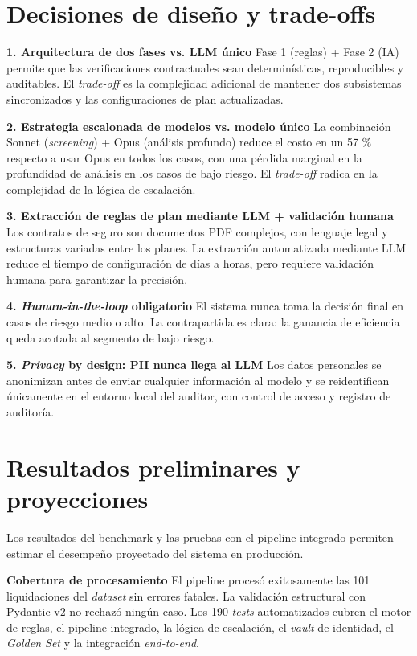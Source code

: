 \section{Decisiones de diseño y trade-offs}

\noindent \textbf{1. Arquitectura de dos fases vs. LLM único} Fase 1 (reglas) + Fase 2 (IA) permite que las verificaciones contractuales sean determinísticas, reproducibles y auditables. El \textit{trade-off} es la complejidad adicional de mantener dos subsistemas sincronizados y las configuraciones de plan actualizadas.

\noindent \textbf{2. Estrategia escalonada de modelos vs. modelo único} La combinación Sonnet (\textit{screening}) + Opus (análisis profundo) reduce el costo en un 57 \% respecto a usar Opus en todos los casos, con una pérdida marginal en la profundidad de análisis en los casos de bajo riesgo. El \textit{trade-off} radica en la complejidad de la lógica de escalación.

\noindent \textbf{3. Extracción de reglas de plan mediante LLM + validación humana} Los contratos de seguro son documentos PDF complejos, con lenguaje legal y estructuras variadas entre los planes. La extracción automatizada mediante LLM reduce el tiempo de configuración de días a horas, pero requiere validación humana para garantizar la precisión.

\noindent \textbf{4. \textit{Human-in-the-loop} obligatorio} El sistema nunca toma la decisión final en casos de riesgo medio o alto. La contrapartida es clara: la ganancia de eficiencia queda acotada al segmento de bajo riesgo.

\noindent \textbf{5. \textit{Privacy} by design: PII nunca llega al LLM} Los datos personales se anonimizan antes de enviar cualquier información al modelo y se reidentifican únicamente en el entorno local del auditor, con control de acceso y registro de auditoría.

\section{Resultados preliminares y proyecciones}
\label{sec:resultados-preliminares}

Los resultados del benchmark y las pruebas con el pipeline integrado permiten estimar el desempeño proyectado del sistema en producción.

\textbf{Cobertura de procesamiento} El pipeline procesó exitosamente las 101 liquidaciones del \textit{dataset}  sin errores fatales. La validación estructural con Pydantic v2 no rechazó ningún caso. Los 190 \textit{tests} automatizados cubren el motor de reglas, el pipeline integrado, la lógica de escalación, el \textit{vault} de identidad, el \textit{Golden Set} y la integración \textit{end-to-end}.

